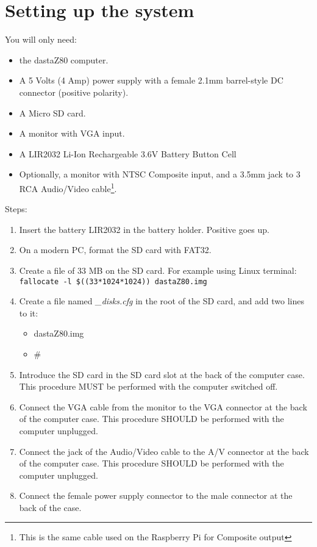 \section{Setting up the system}
\label{sec:setting_system}
You will only need:

\begin{itemize}
    \item the dastaZ80 computer.
    \item A 5 Volts (4 Amp) power supply with a female 2.1mm barrel-style DC
    connector (positive polarity).
    \item A Micro SD card.
    \item A monitor with VGA input.
    \item A LIR2032 Li-Ion Rechargeable 3.6V Battery Button Cell
    \item Optionally, a monitor with NTSC Composite input, and a 3.5mm jack
    to 3 RCA Audio/Video cable\footnote{This is the same cable used on the
    Raspberry Pi for Composite output}.
\end{itemize}

Steps:

\begin{enumerate}
    \item Insert the battery LIR2032 in the battery holder. Positive goes up.
    \item On a modern PC, format the SD card with FAT32.
    \item Create a file of 33 MB on the SD card. For example using Linux 
    terminal:  \texttt{fallocate -l \$((33*1024*1024)) dastaZ80.img}
    \item Create a file named \textit{\_disks.cfg} in the root of the SD card,
    and add two lines to it:
    \begin{itemize}
        \item dastaZ80.img
        \item \#
    \end{itemize}
    \item Introduce the SD card in the SD card slot at the back of the
    computer case. This procedure MUST be performed with the computer
    switched off.
    \item Connect the VGA cable from the monitor to the VGA connector at the
    back of the computer case. This procedure SHOULD be performed with the
    computer unplugged.
    \item Connect the jack of the Audio/Video cable to the A/V connector at
    the back of the computer case. This procedure SHOULD be performed with
    the computer unplugged.
    \item Connect the female power supply connector to the male connector at
    the back of the case.
\end{enumerate}

